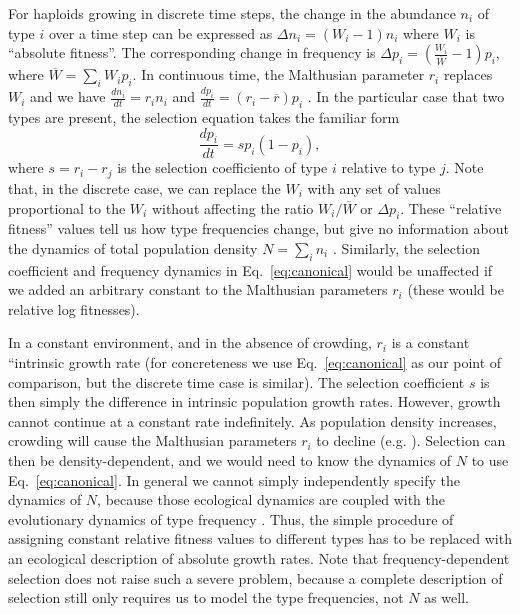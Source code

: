 \documentclass[12pt]{article}
\begin{document}
For haploids growing in discrete time steps, the change in the abundance $n_i$ of type $i$ over a time step can be expressed as $\Delta n_i=(W_i - 1)n_i$ where $W_i$ is ``absolute fitness''. The corresponding change in frequency is $\Delta p_i=\left(\frac{W_i}{\overline{W}}-1\right) p_i$, where $\overline{W}=\sum_i W_i p_i$. In continuous time, the Malthusian parameter $r_i$ replaces $W_i$ and we have $\frac{d n_i}{dt}=r_in_i$ and $\frac{d p_i}{dt}=(r_i-\overline{r}) p_i$ \citep[pp. 26]{crow_1970}. In the particular case that two types are present, the selection equation takes the familiar form
\begin{equation}
\frac{d p_i}{dt}=s p_i(1-p_i), \label{eq:canonical}
\end{equation}
where $s=r_i-r_j$ is the selection coefficiento of type $i$ relative to type $j$. Note that, in the discrete case, we can replace the $W_i$ with any set of values proportional to the $W_i$ without affecting the  ratio $W_i/\overline{W}$ or $\Delta p_i$. These ``relative fitness'' values tell us how type frequencies change, but give no information about the dynamics of total population density $N=\sum_i n_i$ \citep[pp. 468]{barton_2007}. Similarly, the selection coefficient and frequency dynamics in Eq.~\eqref{eq:canonical} would be unaffected if we added an arbitrary constant to the Malthusian parameters $r_i$ (these would be relative log fitnesses).  

In a constant environment, and in the absence of crowding, $r_i$ is a constant ``intrinsic growth rate (for concreteness we use Eq.~\eqref{eq:canonical} as our point of comparison, but the discrete time case is similar). The selection coefficient $s$ is then simply the difference in intrinsic population growth rates. However, growth cannot continue at a constant rate indefinitely. As population density increases, crowding will cause the Malthusian parameters $r_i$ to decline (e.g. \citealt[pp. 203]{begon_1990}). Selection can then be density-dependent, and we would need to know the dynamics of $N$ to use Eq.~\eqref{eq:canonical}. In general we cannot simply independently specify the dynamics of $N$, because those ecological dynamics are coupled with the evolutionary dynamics of type frequency \citep{travis_2013}. Thus, the simple procedure of assigning constant relative fitness values to different types has to be replaced with an ecological description of absolute growth rates. Note that frequency-dependent selection does not raise such a severe problem, because a complete description of selection still only requires us to model the type frequencies, not $N$ as well. 
\end{document}
